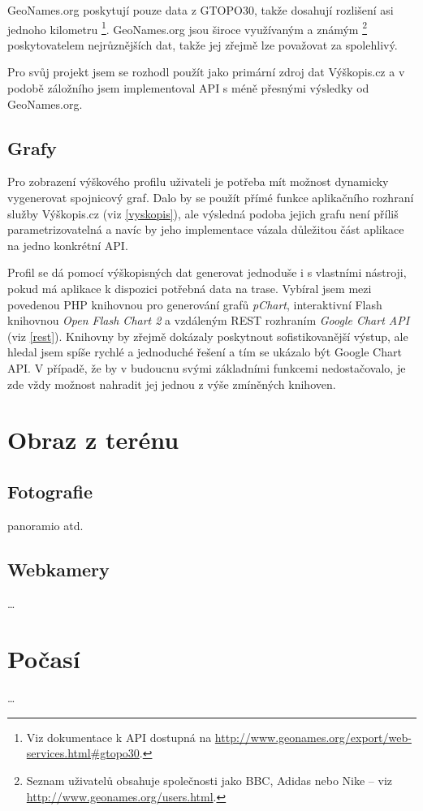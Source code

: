 GeoNames.org poskytují pouze data z
GTOPO30, takže dosahují rozlišení asi jednoho kilometru
\footnote{Viz dokumentace k API dostupná na
\url{http://www.geonames.org/export/web-services.html\#gtopo30}.}. GeoNames.org jsou široce využívaným a známým \footnote{Seznam uživatelů obsahuje společnosti jako BBC, Adidas nebo Nike -- viz \url{http://www.geonames.org/users.html}.} poskytovatelem nej\-růz\-něj\-ších dat, takže jej zřejmě lze považovat za spolehlivý.

Pro svůj projekt jsem se rozhodl použít jako primární zdroj dat
Výškopis.cz a v podobě záložního jsem implementoval API s méně
přesnými výsledky od GeoNames.org.

\subsection{Grafy}\label{grafy}
Pro zobrazení výškového profilu uživateli je potřeba mít možnost
dynamicky vygenerovat spojnicový graf. Dalo by se použít přímé funkce
aplikačního rozhraní služby Výškopis.cz (viz \ref{vyskopis}), ale
výsledná podoba jejich grafu není příliš parametrizovatelná a navíc by
jeho implementace vázala důležitou část aplikace na jedno konkrétní API.

Profil se dá pomocí výškopisných dat generovat jednoduše i s
vlastními nástroji, pokud má aplikace k dispozici potřebná data na
trase. Vybíral jsem mezi povedenou PHP knihovnou pro generování
grafů {\it pChart}, interaktivní Flash knihovnou {\it Open Flash Chart
2} a vzdáleným REST rozhraním {\it Google Chart API} (viz \ref{rest}).
Knihovny by zřejmě dokázaly poskytnout sofistikovanější
výstup, ale hledal jsem spíše rychlé a jednoduché řešení a tím se
ukázalo být Google Chart API. V případě, že by v budoucnu svými
základními funkcemi nedostačovalo, je zde vždy možnost nahradit jej
jednou z výše zmíněných knihoven.

\section{Obraz z terénu}
\subsection{Fotografie}
panoramio atd.
\subsection{Webkamery}
\ldots

\section{Počasí}
\ldots

